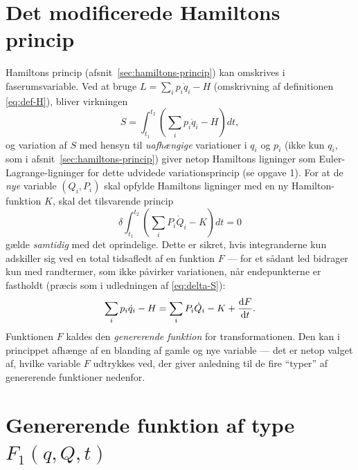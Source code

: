 \section{Det modificerede Hamiltons princip}

Hamiltons princip (afsnit~\ref{sec:hamiltons-princip}) kan omskrives i
faserumsvariable. Ved at bruge $L=\sum_i p_i\dot q_i - H$ (omskrivning
af definitionen \eqref{eq:def-H}), bliver virkningen
\begin{equation}
  S = \int_{t_1}^{t_2}\left(\sum_i p_i\dot q_i - H\right)dt,
\end{equation}
og variation af $S$ med hensyn til \emph{uafhængige} variationer i
$q_i$ og $p_i$ (ikke kun $q_i$, som i afsnit~\ref{sec:hamiltons-princip})
giver netop Hamiltons ligninger som Euler-Lagrange-ligninger for dette
udvidede variationsprincip (se opgave 1). For at de \emph{nye}
variable $(Q_i,P_i)$ skal opfylde Hamiltons ligninger med en ny
Hamilton-funktion $K$, skal det tilsvarende princip
\begin{equation}
  \delta\int_{t_1}^{t_2}\left(\sum_i P_i\dot Q_i - K\right)dt = 0
\end{equation}
gælde \emph{samtidig} med det oprindelige. Dette er sikret, hvis
integranderne kun adskiller sig ved en total tidsafledt af en funktion
$F$ — for et sådant led bidrager kun med randtermer, som ikke påvirker
variationen, når endepunkterne er fastholdt (præcis som i
udledningen af \eqref{eq:delta-S}):
\begin{equation}
  \sum_i p_i\dot q_i - H = \sum_i P_i\dot Q_i - K + \dv{F}{t}.
  \label{eq:genererende-betingelse}
\end{equation}
Funktionen $F$ kaldes den \emph{genererende funktion} for
transformationen. Den kan i princippet afhænge af en blanding af
gamle og nye variable — det er netop valget af, hvilke variable $F$
udtrykkes ved, der giver anledning til de fire ``typer'' af genererende
funktioner nedenfor.

\section{Genererende funktion af type $F_1(q,Q,t)$}

